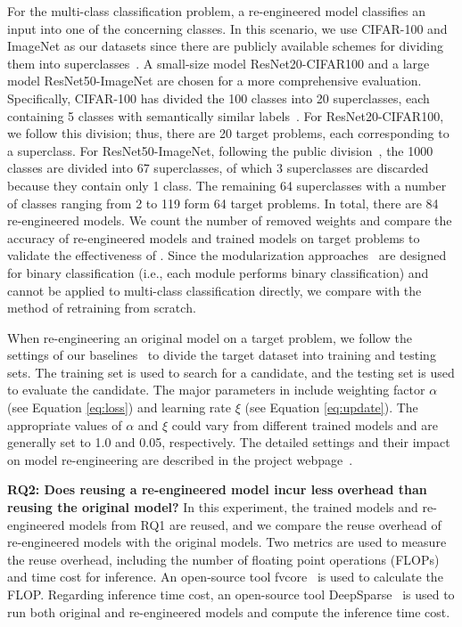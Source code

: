 For the multi-class classification problem, %
a re-engineered model classifies an input into one of the concerning classes.
In this scenario, we use CIFAR-100 and ImageNet as our datasets since there are publicly available schemes for dividing them into superclasses~\cite{cifar10,imagenet_division}.
A small-size model ResNet20-CIFAR100 and a large model ResNet50-ImageNet are chosen for a more comprehensive evaluation. %
Specifically, CIFAR-100 has divided the 100 classes into 20 superclasses, each containing 5 classes with semantically similar labels~\cite{cifar10}.
For ResNet20-CIFAR100, we follow this division; thus, there are 20 target problems, each corresponding to a superclass.
For ResNet50-ImageNet, following the public division~\cite{imagenet_division}, the 1000 classes are divided into 67 superclasses, of which 3 superclasses are discarded because they contain only 1 class. 
The remaining 64 superclasses with a number of classes ranging from 2 to 119 form 64 target problems.
In total, there are 84 re-engineered models.
We count the number of removed weights and compare the accuracy of re-engineered models and trained models on target problems to validate the effectiveness of \projectName. 
Since the modularization approaches~\cite{nnmodularity2022icse,fse2020modularity} are designed for binary classification (i.e., each module performs binary classification) and cannot be applied to multi-class classification directly, we compare \projectName with the method of retraining from scratch. %

When re-engineering an original model on a target problem, we follow the settings of our baselines~\cite{ReMos,cifarmodel} to divide the target dataset into training and testing sets. The training set is used to search for a candidate, and the testing set is used to evaluate the candidate.
The major parameters in \projectName include weighting factor $\alpha$ (see Equation \ref{eq:loss}) and learning rate $\xi$ (see Equation \ref{eq:update}). 
The appropriate values of $\alpha$ and $\xi$ could vary from different trained models and are generally set to 1.0 and 0.05, respectively.
The detailed settings and their impact on model re-engineering are described in the project webpage~\cite{seam}.



\noindent \textbf{RQ2: Does reusing a re-engineered model incur less overhead than reusing the original model?} 
In this experiment, the trained models and re-engineered models from RQ1 are reused, and we compare the reuse overhead of re-engineered models with the original models.
Two metrics are used to measure the reuse overhead, including the number of floating point operations (FLOPs)~\cite{li2016pruning,luo2017thinet} and time cost for inference.
An open-source tool fvcore~\cite{fvcore} is used to calculate the FLOP.
Regarding inference time cost, an open-source tool DeepSparse~\cite{deepsparse} is used to run both original and re-engineered models and compute the inference time cost.

